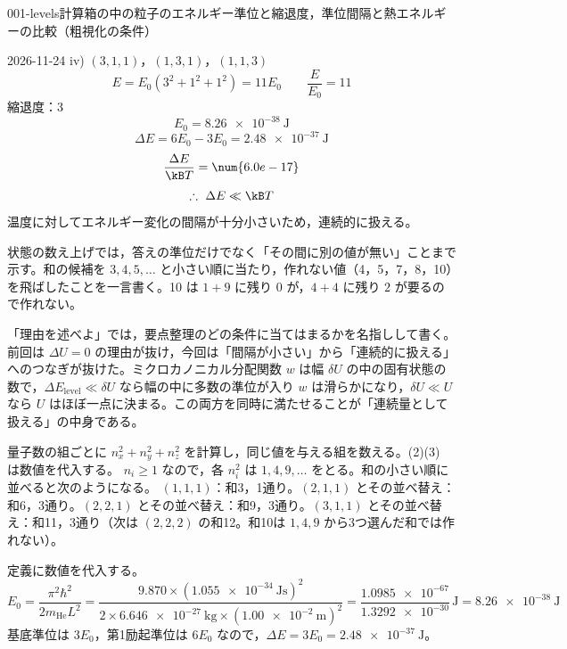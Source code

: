 \documentclass[uplatex,dvipdfmx,a4paper,11pt]{jsarticle}
\begin{document}
\begin{mondai}{001-levels}{計算}{箱の中の粒子のエネルギー準位と縮退度，準位間隔と熱エネルギーの比較（粗視化の条件）}
\begin{kotaeutsushi}{2026-11-24}
iv) $(3,1,1)$，$(1,3,1)$，$(1,1,3)$
\[ E=E_{0}(3^{2}+1^{2}+1^{2})=11E_{0}\qquad\frac{E}{E_{0}}=11 \]
縮退度：3
\[ E_{0}=\qty{8.26e-38}{\joule} \]
\[ \Delta E=6E_{0}-3E_{0}=\qty{2.48e-37}{\joule} \]
\[ \frac{\Delta E}{\kB T}=\num{6.0e-17} \]
\[ \therefore\ \Delta E\ll\kB T \]
温度に対してエネルギー変化の間隔が十分小さいため，連続的に扱える。
\end{kotaeutsushi}
\begin{kizuki}
\item 状態の数え上げでは，答えの準位だけでなく「その間に別の値が無い」ことまで示す。和の候補を $3,4,5,\dots$ と小さい順に当たり，作れない値（4，5，7，8，10）を飛ばしたことを一言書く。10 は $1+9$ に残り $0$ が，$4+4$ に残り $2$ が要るので作れない。
\item {} 「理由を述べよ」では，要点整理のどの条件に当てはまるかを名指しして書く。前回は $\Delta U=0$ の理由が抜け，今回は「間隔が小さい」から「連続的に扱える」へのつなぎが抜けた。ミクロカノニカル分配関数 $w$ は幅 $\delta U$ の中の固有状態の数で，$\Delta E_{\mathrm{level}}\ll\delta U$ なら幅の中に多数の準位が入り $w$ は滑らかになり，$\delta U\ll U$ なら $U$ はほぼ一点に決まる。この両方を同時に満たせることが「連続量として扱える」の中身である。
\end{kizuki}
\begin{tadashii}
\houshin 量子数の組ごとに $n_{x}^{2}+n_{y}^{2}+n_{z}^{2}$ を計算し，同じ値を与える組を数える。(2)(3) は数値を代入する。
\keisan
{} $n_{i}\ge1$ なので，各 $n_{i}^{2}$ は $1,4,9,\dots$ をとる。和の小さい順に並べると次のようになる。
$(1,1,1)$：和3，1通り。$(2,1,1)$ とその並べ替え：和6，3通り。$(2,2,1)$ とその並べ替え：和9，3通り。$(3,1,1)$ とその並べ替え：和11，3通り（次は $(2,2,2)$ の和12。和10は $1,4,9$ から3つ選んだ和では作れない）。

 定義に数値を代入する。
\[E_{0}=\frac{\pi^{2}\hbar^{2}}{2m_{\mathrm{He}}L^{2}}=\frac{\num{9.870}\times(\qty{1.055e-34}{\joule\second})^{2}}{2\times\qty{6.646e-27}{\kilogram}\times(\qty{1.00e-2}{\metre})^{2}}=\frac{\num{1.0985e-67}}{\num{1.3292e-30}}\,\unit{\joule}=\qty{8.26e-38}{\joule}\]
基底準位は $3E_{0}$，第1励起準位は $6E_{0}$ なので，$\Delta E=3E_{0}=\qty{2.48e-37}{\joule}$。


\end{tadashii}
\end{mondai}
\end{document}
